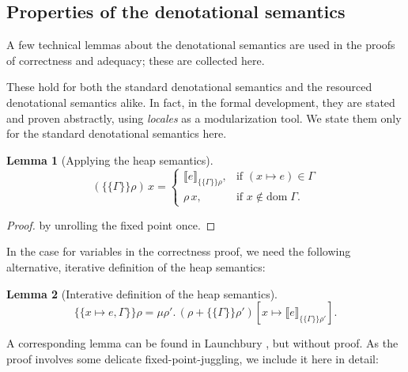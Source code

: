 \documentclass{jfp1}
\newtheorem{lemma}{Lemma}
\theoremstyle{nonumberbreak}
\newtheorem{proof}{Proof}
\newcommand{\dom}[1]{\text{dom}\;#1}
\newcommand{\dsem}[2]{\llbracket #1 \rrbracket_{#2}}
\newcommand{\esem}[1]{\{\!\!\!\{#1\}\!\!\!\}}
\newcommand{\upd}[1]{\mathop{++_{#1}}}
\begin{document}
\subsection{Properties of the denotational semantics}
\label{updsemanticsprops}

A few technical lemmas about the denotational semantics are used in the proofs of correctness and adequacy; these are collected here.

These hold for both the standard denotational semantics and the resourced denotational semantics alike. In fact, in the formal development, they are stated and proven abstractly, using \emph{locales} \cite{locales} as a modularization tool. We state them only for the standard denotational semantics here.


\begin{lemma}[Applying the heap semantics]
\[
\label{lem:esem_this}
\label{lem:esem_other}
(\esem{\Gamma}\rho)\,x =
\begin{cases}
\dsem{e}{\esem{\Gamma}\rho}, & \text{if } (x\mapsto e)\in \Gamma \\
\rho\, x, & \text{if } x \notin \dom\Gamma.
\end{cases}
\]
\end{lemma}

\begin{proof}
by unrolling the fixed point once.
\end{proof}

In the case for variables in the correctness proof, we need the following alternative, iterative definition of the heap semantics:

\begin{lemma}[Interative definition of the heap semantics]
\[
\esem{x \mapsto e, \Gamma}\rho =
\mu \rho'.\,  (\rho \upd{\dom\Gamma} {\esem{\Gamma}{\rho'}})[x \mapsto \dsem{e}{\esem{\Gamma}\rho'}].
\label{lem:iter}
\]
\end{lemma}

A corresponding lemma can be found in Launchbury , but without proof. As the proof involves some delicate fixed-point-juggling, we include it here in detail:
\end{document}
